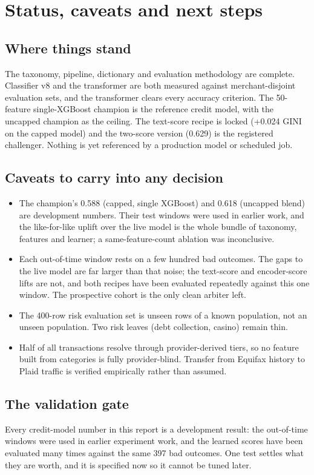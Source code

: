\section{Status, caveats and next steps}
\subsection{Where things stand}
The taxonomy, pipeline, dictionary and evaluation methodology are complete. Classifier v8 and the transformer are both measured against merchant-disjoint evaluation sets, and the transformer clears every accuracy criterion. The 50-feature single-XGBoost champion is the reference credit model, with the uncapped champion as the ceiling. The text-score recipe is locked (+0.024 GINI on the capped model) and the two-score version (0.629) is the registered challenger. Nothing is yet referenced by a production model or scheduled job.

\subsection{Caveats to carry into any decision}
\begin{itemize}
\item The champion's 0.588 (capped, single XGBoost) and 0.618 (uncapped blend) are development numbers. Their test windows were used in earlier work, and the like-for-like uplift over the live model is the whole bundle of taxonomy, features and learner; a same-feature-count ablation was inconclusive.
\item Each out-of-time window rests on a few hundred bad outcomes. The gaps to the live model are far larger than that noise; the text-score and encoder-score lifts are not, and both recipes have been evaluated repeatedly against this one window. The prospective cohort is the only clean arbiter left.
\item The 400-row risk evaluation set is unseen rows of a known population, not an unseen population. Two risk leaves (debt collection, casino) remain thin.
\item Half of all transactions resolve through provider-derived tiers, so no feature built from categories is fully provider-blind. Transfer from Equifax history to Plaid traffic is verified empirically rather than assumed.
\end{itemize}
\subsection{The validation gate}
Every credit-model number in this report is a development result: the out-of-time windows were used in earlier experiment work, and the learned scores have been evaluated many times against the same 397 bad outcomes. One test settles what they are worth, and it is specified now so it cannot be tuned later.

